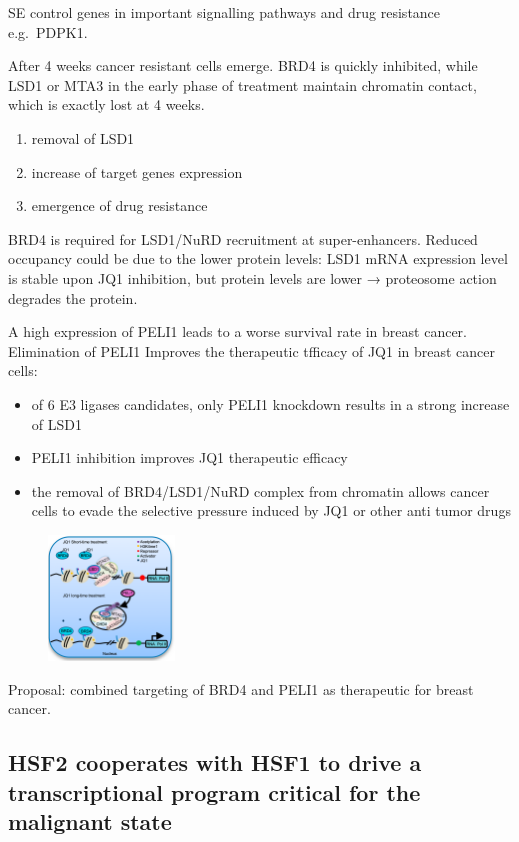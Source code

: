 SE control genes in important signalling pathways and drug resistance e.g.~PDPK1.

After 4 weeks cancer resistant cells emerge. BRD4 is quickly inhibited,
while LSD1 or MTA3 in the early phase of treatment maintain chromatin
contact, which is exactly lost at 4 weeks.
\begin{enumerate}
\tightlist
\item
  removal of LSD1
\item
  increase of target genes expression
\item
  emergence of drug resistance
\end{enumerate}

BRD4 is required for LSD1/NuRD recruitment at super-enhancers. Reduced occupancy could be due to the lower protein levels: LSD1 mRNA expression level is stable upon JQ1 inhibition, but protein levels are
lower → proteosome action degrades the protein.

A high expression of PELI1 leads to a worse survival rate in breast cancer. Elimination of PELI1 Improves the therapeutic tfficacy of JQ1 in breast cancer cells:
\begin{itemize}
\tightlist
\item
  of 6 E3 ligases candidates, only PELI1 knockdown results in a strong
  increase of LSD1
\item
  PELI1 inhibition improves JQ1 therapeutic efficacy
\item
  the removal of BRD4/LSD1/NuRD complex from chromatin allows cancer
  cells to evade the selective pressure induced by JQ1 or other anti
  tumor drugs
\end{itemize}

\begin{figure}
\centering
\includegraphics[width=0.3\textwidth]{../_resources/Screenshot_2022-10-28_at_11-55-04.png}
\caption{}
\end{figure}

Proposal: combined targeting of BRD4 and PELI1 as therapeutic for breast
cancer.

\subsection{HSF2 cooperates with HSF1 to drive a transcriptional program critical for the malignant state}

